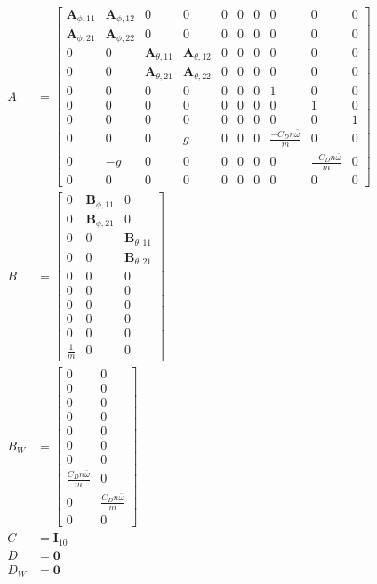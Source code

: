 \begin{align}
A &= \begin{bmatrix}
\mathbf{A}_{\phi,11} & \mathbf{A}_{\phi,12} & 0 & 0 & 0 & 0 & 0 & 0 & 0 & 0 \\
\mathbf{A}_{\phi,21} & \mathbf{A}_{\phi,22} & 0 & 0 & 0 & 0 & 0 & 0 & 0 & 0 \\
0 & 0 & \mathbf{A}_{\theta,11} & \mathbf{A}_{\theta,12} & 0 & 0 & 0 & 0 & 0 & 0  \\
0 & 0 & \mathbf{A}_{\theta,21} & \mathbf{A}_{\theta,22} & 0 & 0 & 0 & 0 & 0 & 0  \\
0 & 0 & 0 & 0 & 0 & 0 & 0 & 1 & 0 & 0 \\
0 & 0 & 0 & 0 & 0 & 0 & 0 & 0 & 1 & 0 \\
0 & 0 & 0 & 0 & 0 & 0 & 0 & 0 & 0 & 1 \\
0 & 0 & 0 & g & 0 & 0 & 0 & \frac{-C_D n \bar{\omega}}{m} & 0 & 0 \\
0 & -g & 0 & 0 & 0 & 0 & 0 & 0 & \frac{-C_D n \bar{\omega}}{m} & 0 \\
0 & 0 & 0 & 0 & 0 & 0 & 0 & 0 & 0 & 0 
\end{bmatrix} \\
B &= \begin{bmatrix}
0 & \mathbf{B}_{\phi,11} & 0 \\
0 & \mathbf{B}_{\phi,21} & 0 \\
0 & 0 & \mathbf{B}_{\theta,11} \\
0 & 0 & \mathbf{B}_{\theta,21} \\
0 & 0 & 0 \\
0 & 0 & 0 \\
0 & 0 & 0 \\
0 & 0 & 0 \\
0 & 0 & 0 \\
\frac{1}{m} & 0 & 0
\end{bmatrix} \\
B_W &= \begin{bmatrix}
0 & 0 \\
0 & 0 \\
0 & 0 \\
0 & 0 \\
0 & 0 \\
0 & 0 \\
0 & 0 \\
\frac{C_D n \bar{\omega}}{m} & 0 \\
0 & \frac{C_D n \bar{\omega}}{m} \\
0 & 0
\end{bmatrix} \\
C &= \mathbf{I}_10 \\
D &= \mathbf{0} \\
D_W &= \mathbf{0}
\end{align}
